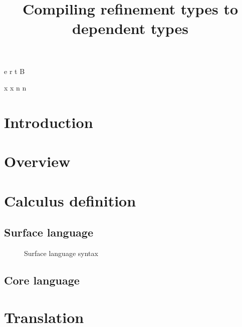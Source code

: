 \documentclass[a4paper]{article}
\begin{document}
\newnonterm e \epsilon
\newnonterm r \rho
\newnonterm t \tau
\newnonterm B {}

\newgterm x x
\newgterm n n


\title{Compiling refinement types to dependent types}

\maketitle

\section{Introduction}

\section{Overview}

\section{Calculus definition}

\subsection{Surface language}

\begin{figure}
  \caption{Surface language syntax}
  \label{fig:surface_syntax}
\end{figure}

\subsection{Core language}

\section{Translation}
\end{document}
